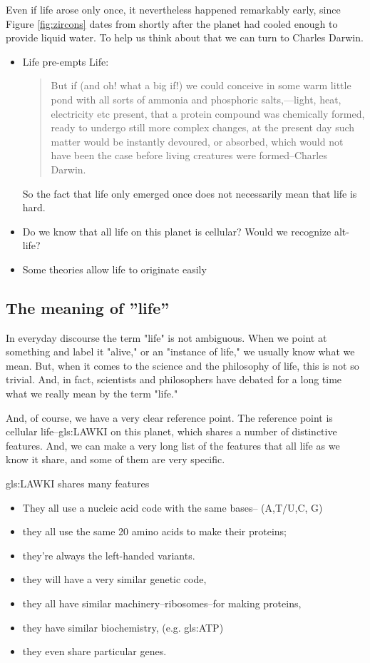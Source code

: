 \documentclass[]{article}
\begin{document}
 Even if life arose only once, it nevertheless happened remarkably early, since Figure \ref{fig:zircons} dates from shortly after the planet had cooled enough to provide liquid water. To help us think about that we can turn to Charles Darwin.
\begin{itemize}
	\item Life pre-empts Life: \begin{quotation}
		But if (and oh! what a big if!) we could conceive in some warm little pond with all sorts of ammonia and phosphoric salts,—light, heat, electricity etc present, that a protein compound was chemically formed, ready to undergo still more complex changes, at the present day such matter would be instantly devoured, or absorbed, which would not have been the case before living creatures were formed--Charles Darwin\cite{darwin1871letter}. 
	\end{quotation}So the fact that life only emerged once does not necessarily mean that life is hard.
	
	\item Do we know that all life on this planet is cellular? Would we recognize alt-life?
	
	\item Some theories allow life to originate easily\cite{wachtershauser1988before}
\end{itemize}

\subsection{The meaning of ''life''}
In everyday discourse the term "life" is not ambiguous.
When we point at something and label it "alive," or an "instance of life," we usually know what we mean.
But, when it comes to the science and the philosophy of life, this is not so trivial.
And, in fact, scientists and philosophers have debated for a long time what we really mean by the term "life."

And, of course, we have a very clear reference point.
The reference point is cellular life--\gls{gls:LAWKI} on this planet,
which shares a number of distinctive features.
And, we can make a very long list of the features that all life as we know it share, and some of them are very specific.

\gls{gls:LAWKI} shares many features
\begin{itemize}
	\item They all use a nucleic acid code 	with the same bases-- (A,T/U,C, G)
	\item they all use the same 20 amino acids 	to make their proteins;
	\item they're always the left-handed variants.
	\item they will have a very similar genetic code,
	\item they all have similar machinery--ribosomes--for making proteins,
	\item they have similar biochemistry, (e.g. \gls{gls:ATP})
	\item they even share particular genes.
\end{itemize}
\end{document}
